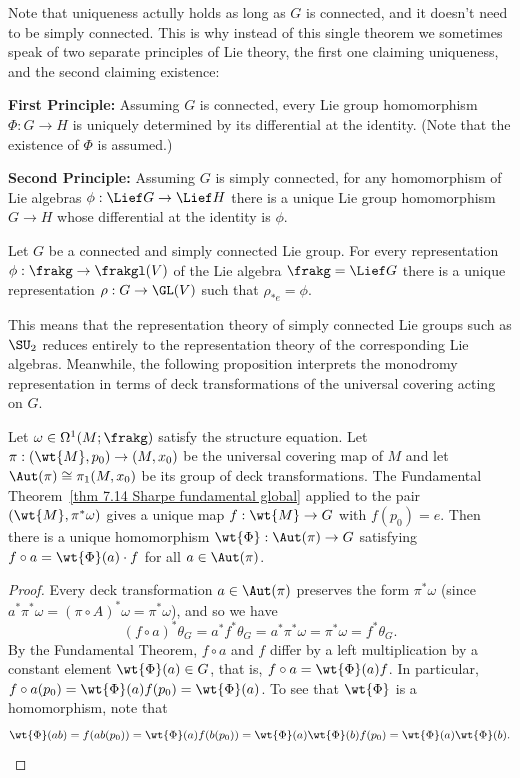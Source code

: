 \begin{rem}
    Note that uniqueness actully holds as long as $G$ is connected, and it doesn't need to be simply connected. This is why instead of this single theorem we sometimes speak of two separate principles of Lie theory, the first one claiming uniqueness, and the second claiming existence:

    \textbf{First Principle:} Assuming $G$ is connected, every Lie group homomorphism $\Phi:G\to H$ is uniquely determined by its differential at the identity. (Note that the existence of $\Phi$ is assumed.)

    \textbf{Second Principle:} Assuming $G$ is simply connected, for any homomorphism of Lie algebras $\phi:\Lief G\to \Lief H$ there is a unique Lie group homomorphism $G\to H$ whose differential at the identity is $\phi$.
\end{rem}

\begin{cor}\label{cor generated homomorphism}
    Let $G$ be a connected and simply connected Lie group. For every representation $\phi:\frakg\to \frakgl(V)$ of the Lie algebra $\frakg=\Lief G$ there is a unique representation $\rho:G\to \GL(V)$ such that $\rho_{\ast e}=\phi$.
\end{cor}

This means that the representation theory of simply connected Lie groups such as $\SU_2$ reduces entirely to the representation theory of the corresponding Lie algebras. Meanwhile, the following proposition interprets the monodromy representation in terms of deck transformations of the universal covering acting on $G$.

\begin{prop}\label{prop 8.1 Sharpe}
    Let $\omega\in\Omega^1(M;\frakg)$ satisfy the structure equation. Let $\pi:(\wt{M},p_0)\to (M,x_0)$ be the universal covering map of $M$ and let $\Aut(\pi)\cong \pi_1(M,x_0)$ be its group of deck transformations. The Fundamental Theorem~\ref{thm 7.14 Sharpe fundamental global} applied to the pair $(\wt{M},\pi^\ast\omega)$ gives a unique map $f:\wt{M}\to G$ with $f(p_0)=e$. Then there is a unique homomorphism $\wt{\Phi}: \Aut(\pi)\to G$ satisfying $f\circ a=\wt{\Phi}(a)\cdot f$ for all $a\in\Aut(\pi)$.
\end{prop}
\begin{proof}
    Every deck transformation $a\in \Aut(\pi)$ preserves the form $\pi^\ast\omega$ (since $a^\ast \pi^\ast\omega=(\pi\circ A)^\ast\omega=\pi^\ast\omega$), and so we have
    \[(f\circ a)^\ast\theta_G=a^\ast f^\ast\theta_G=a^\ast \pi^\ast\omega=\pi^\ast\omega=f^\ast\theta_G.\]
    By the Fundamental Theorem, $f\circ a$ and $f$ differ by a left multiplication by a constant element $\wt{\Phi}(a)\in G$, that is, $f\circ a=\wt{\Phi}(a)f$. In particular, $f\circ a(p_0)=\wt{\Phi}(a)f(p_0)=\wt{\Phi}(a)$. To see that $\wt{\Phi}$ is a homomorphism, note that 
    \[\wt{\Phi}(ab)=f(ab(p_0))=\wt{\Phi}(a)f(b(p_0))=\wt{\Phi}(a)\wt{\Phi}(b)f(p_0)=\wt{\Phi}(a)\wt{\Phi}(b).\]
\end{proof}

